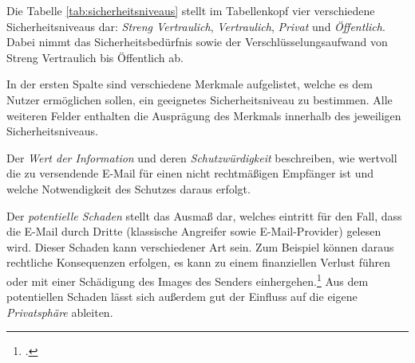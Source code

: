\documentclass  [paper=a4,
				fontsize=12pt,
				listof=totoc,
				bibliography=totoc
				]{scrreprt}
\begin{document}
		Die Tabelle \ref{tab:sicherheitsniveaus} stellt im Tabellenkopf vier verschiedene Sicherheitsniveaus dar: \textit{Streng Vertraulich}, \textit{Vertraulich}, \textit{Privat} und \textit{Öffentlich}. Dabei nimmt das Sicherheitsbedürfnis sowie der Verschlüsselungsaufwand von Streng Vertraulich bis Öffentlich ab.
		
		In der ersten Spalte sind verschiedene Merkmale aufgelistet, welche es dem Nutzer ermöglichen sollen, 
		ein geeignetes Sicherheitsniveau zu bestimmen.
		Alle weiteren Felder enthalten die Ausprägung des Merkmals innerhalb des jeweiligen Sicherheitsniveaus.
		
		Der \textit{Wert der Information} und deren \textit{Schutzwürdigkeit} beschreiben, wie wertvoll die zu versendende E-Mail für einen nicht rechtmäßigen Empfänger ist und welche Notwendigkeit des Schutzes daraus erfolgt.
		
		Der \textit{potentielle Schaden} stellt das Ausmaß dar, welches eintritt für den Fall, dass die E-Mail durch 			%
		Dritte (klassische Angreifer sowie  E-Mail-Provider) gelesen wird. Dieser Schaden kann verschiedener Art sein. Zum Beispiel können daraus rechtliche Konsequenzen erfolgen, es kann zu einem finanziellen Verlust führen oder mit einer Schädigung des Images des Senders einhergehen.\footcite[Vgl.][S. 6]{Reinhausen12} Aus dem potentiellen Schaden lässt sich außerdem gut der Einfluss auf die eigene \textit{Privatsphäre} ableiten.
		
	\pagebreak
\end{document}
